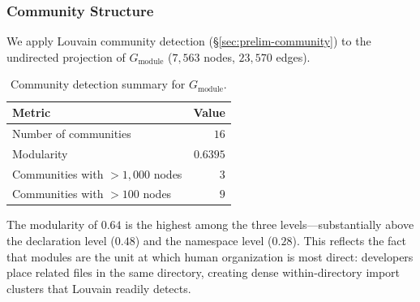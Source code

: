 \subsubsection{Community Structure}
\label{sec:module-community}
\label{sec:sa-community}

We apply Louvain community detection (\S\ref{sec:prelim-community}) to the undirected projection of $G_{\mathrm{module}}$ ($7{,}563$ nodes, $23{,}570$ edges).

\begin{table}[ht]
\centering
\caption{Community detection summary for $G_{\mathrm{module}}$.}
\label{tab:module-community-summary}
\begin{tabular}{lr}
\toprule
Metric & Value \\
\midrule
Number of communities & $16$ \\
Modularity & $0.6395$ \\
Communities with ${>}1{,}000$ nodes & $3$ \\
Communities with ${>}100$ nodes & $9$ \\
\bottomrule
\end{tabular}
\end{table}

The modularity of $0.64$ is the highest among the three levels---substantially above the declaration level ($0.48$) and the namespace level ($0.28$). This reflects the fact that modules are the unit at which human organization is most direct: developers place related files in the same directory, creating dense within-directory import clusters that Louvain readily detects.

